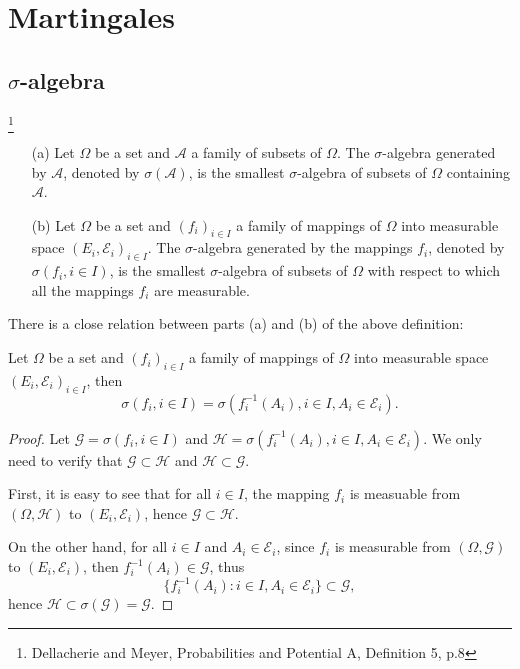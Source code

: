 \chapter{Martingales}

\section{$\sigma$-algebra}

\begin{definition}
\footnote{Dellacherie and Meyer, Probabilities and Potential A, Definition 5, 
p.8}
\begin{enumerate}
\item[(a)] 
Let $\Omega$ be a set and $\mathcal{A}$ a family of subsets of $\Omega$. The 
$\sigma$-algebra generated by $\mathcal{A}$, denoted by $\sigma(\mathcal{A})$,
is the smallest $\sigma$-algebra of subsets of $\Omega$ containing
$\mathcal{A}$.
\item[(b)]
Let $\Omega$ be a set and $(f_i)_{i\in I}$ a family of mappings of $\Omega$ into
measurable space $(E_i,\mathcal{E}_i)_{i\in I}$. The $\sigma$-algebra generated
by the mappings $f_i$, denoted by $\sigma(f_i,i\in I)$, is the smallest
$\sigma$-algebra of subsets of $\Omega$ with respect to which all the mappings
$f_i$ are measurable.
\end{enumerate}
\end{definition}

There is a close relation between parts (a) and (b) of the above definition:
\begin{lemma}
Let $\Omega$ be a set and $(f_i)_{i\in I}$ a family of mappings of $\Omega$ into
measurable space $(E_i,\mathcal{E}_i)_{i\in I}$, then
\[
  \sigma(f_i, i\in I)= \sigma(f_i^{-1}(A_i), i\in I, A_i\in\mathcal{E}_i).
\]
\end{lemma}
\begin{proof}
Let $\mathcal{G}=\sigma(f_i, i\in I)$ and
$\mathcal{H}=\sigma(f_i^{-1}(A_i), i\in I, A_i\in\mathcal{E}_i)$. 
We only need to verify that 
$\mathcal{G}\subset \mathcal{H}$ and $\mathcal{H}\subset \mathcal{G}$.

First, it is easy to see that for all $i\in I$, the mapping $f_i$ is measuable 
from $(\Omega,\mathcal{H})$ to $(E_i,\mathcal{E}_i)$, hence 
$\mathcal{G}\subset \mathcal{H}$.

On the other hand, for all $i\in I$ and $A_i\in\mathcal{E}_i$, since $f_i$ is
measurable from $(\Omega,\mathcal{G})$ to $(E_i,\mathcal{E}_i)$, then 
$f_i^{-1}(A_i)\in\mathcal{G}$, thus 
\[
  \{f_i^{-1}(A_i): i\in I, A_i\in\mathcal{E}_i\}\subset \mathcal{G}, 
\]
hence
$\mathcal{H}\subset \sigma(\mathcal{G})= \mathcal{G}$.
\end{proof}

